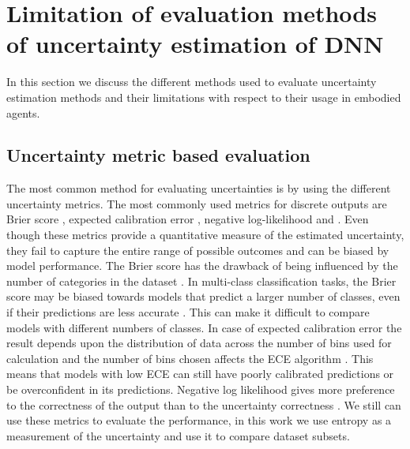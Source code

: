 
\hypertarget{limitation-of-evaluation-methods-of-uncertainty-estimation-of-dnn}{%
\section{Limitation of evaluation methods of uncertainty estimation of
DNN}\label{limitation-of-evaluation-methods-of-uncertainty-estimation-of-dnn}}

In this section we discuss the different methods used to evaluate uncertainty estimation methods and their limitations with respect to their usage in embodied agents.

\hypertarget{uncertainty-metric-based-evaluation}{%
\subsection{Uncertainty metric based evaluation}
\label{uncertainty-metric-based-evaluation}}

The most common method for evaluating uncertainties is by using the
different uncertainty metrics. The most commonly used metrics for
discrete outputs are Brier score \cite{gal2016dropout} \cite{lakshminarayanan2017simple} \cite{liu2020simple}, expected calibration
error \cite{carneiro2020deep} \cite{maddox2019simple}, negative log-likelihood and  \cite{loquercio2020general} \cite{wang2019deep} \cite{sensoy2018evidential}. Even though these metrics provide a
quantitative measure of the estimated uncertainty, they fail to capture
the entire range of possible outcomes and can be biased by model performance. The Brier score has the drawback of being
influenced by the number of categories in the dataset \cite{assel2017brier}  . In
multi-class classification tasks, the Brier score may be biased towards
models that predict a larger number of classes, even if their
predictions are less accurate \cite{rindt2022survival}. This can make it difficult to compare
models with different numbers of classes. In case of
expected calibration error the result depends upon the distribution of
data across the number of bins used for calculation and the number of
bins chosen affects the ECE algorithm  \cite{nixon2019measuring}. This means that
models with low ECE can still have poorly calibrated predictions or be
overconfident in its predictions. Negative log likelihood gives more
preference to the correctness of the output than to the uncertainty
correctness \cite{Ashukha2020PitfallsOI}. We still
can use these metrics to evaluate the performance, in this work we use entropy as
a measurement of the uncertainty and use it to compare dataset
subsets.

